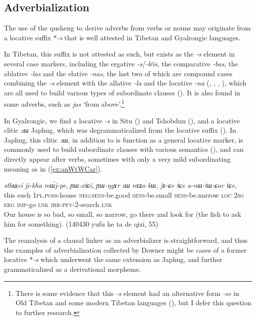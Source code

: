 \documentclass[oneside,a4paper,11pt]{article}
\newcommand{\ipa}[1]{{\phon\textit{\mbox{#1}}}}
\begin{document}
\subsection{Adverbialization}
The use of the qusheng  to derive adverbs from verbs or nouns may originate from a locative suffix *\ipa{-s} that is well attested in Tibetan and Gyalrongic languages.

In Tibetan, this suffix is not attested as such, but exists as the \ipa{-s} element in several case markers, including the ergative \ipa{-s}/\ipa{-kʲis}, the comparative \ipa{-bas}, the ablative \ipa{-las} and the elative \ipa{-nas}, the last two of which are compound cases combining the \ipa{-s} element with the allative \ipa{-la} and the locative \ipa{-na} (\citet{konow09intro},  \citealt{delancey82ergative}, \citealt[282]{zeisler11kenhat}, \citealt{hill12bas}), which are all used to build various types of subordinate clauses (\citealt{tournadre10cases}). It is also found in some adverbs, such as \ipa{jas} `from above'.\footnote{There is some evidence that this \ipa{-s} element had an alternative form \ipa{-se} in Old Tibetan and some modern Tibetan languages (\citealt[280-284]{zeisler11kenhat}), but I defer this question to further research.}

In Gyalrongic, we find a locative \ipa{-s} in Situ (\citealt{linxr93jiarong}) and Tshobdun (\citealt[129]{jackson98morphology}), and a locative clitic \ipa{zɯ} Japhug, which was degrammaticalized from the locative suffix (\citealt[167-9]{jacques08}). In Japhug, this clitic \ipa{zɯ}, in addition to is function as a general locative marker, is commonly used to build subordinate clauses with various semantics (\citealt[275;293]{jacques14linking}), and can directly appear after verbs, sometimes with only a very mild subordinating meaning as in (\ref{ex:anWtWCar}).

\begin{exe}
\ex \label{ex:anWtWCar}
\gll \ipa{kɯki} 	\ipa{sthɯci} 	\ipa{ji-kha} 	\ipa{mɯ́j-pe,} 	\ipa{ɲɯ-xtɕi,} 	\ipa{ɲɯ-ŋgɤr} 	\ipa{zɯ} 	\ipa{nɤʑo} 	\ipa{kɯ,}  \ipa{jɤ-ɕe} 	\ipa{tɕe} 	\ipa{a-nɯ-tɯ-ɕar} 	\ipa{tɕe,}  \\
this such \textsc{1pl.poss}-house \textsc{neg:sens}-be.good  \textsc{sens}-be.small  \textsc{sens}-be.narrow \textsc{loc} \textsc{2sg} \textsc{erg} \textsc{imp}-go \textsc{lnk}  \textsc{irr-pfv}-2-search \textsc{lnk} \\
\glt Our house is so bad, so small, so narrow, go there and look for (the fish to ask him for something). (140430 yufu he ta de qizi, 55)
\end{exe}
The reanalysis of a clausal linker as an adverbializer is straightforward, and thus the examples of adverbialization collected by Downer might be cases of a former locative *\ipa{-s} which underwent the same extension as Japhug, and further grammaticalized as a derivational morpheme.
 
\end{document}

